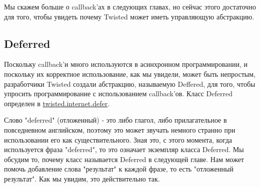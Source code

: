 Мы скажем больше о callback'ах в следующих главах, 
но сейчас этого достаточно для того, чтобы увидеть 
почему Twisted может иметь управляющую абстракцию.


\subsection{Deferred}



Поскольку callback'и много используются в асинхронном 
программировании, и поскольку их корректное использование, 
как мы увидели, может быть непростым, разработчики Twisted 
создали абстракцию, называемую Deffered, для того, чтобы упросить 
программирование с использованием callback'ов. Класс Deferred определен в 
\href{http://twistedmatrix.com/trac/browser/tags/releases/twisted-8.2.0/twisted/internet/defer.py#L132}{twisted.internet.defer}.


Слово "deferred" (отложенный) - это либо глагол, либо прилагательное 
в повседневном английском, поэтому это может звучать немного странно 
при использовании его как существительного. Зная это, с этого момента, 
когда используется фраза "deferred", то это означает экземпляр 
класса Deferred. Мы обсудим то, почему класс называется Deferred в 
следующей главе. Нам может помочь добавление слова "результат" к каждой 
фразе, то есть "отложенный результат". Как мы увидим, это действительно так. 


